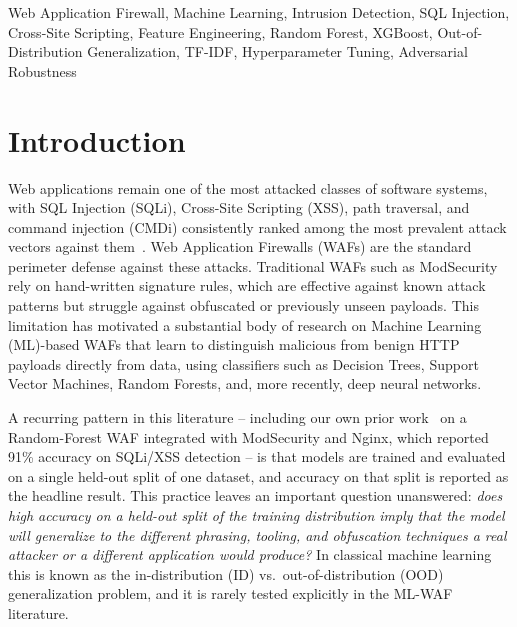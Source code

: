 \documentclass{ieeeaccess}
\begin{document}
\begin{keywords}
Web Application Firewall, Machine Learning, Intrusion Detection, SQL
Injection, Cross-Site Scripting, Feature Engineering, Random Forest, XGBoost,
Out-of-Distribution Generalization, TF-IDF, Hyperparameter Tuning,
Adversarial Robustness
\end{keywords}

\titlepgskip=-15pt

\maketitle

\section{Introduction}

Web applications remain one of the most attacked classes of software systems,
with SQL Injection (SQLi), Cross-Site Scripting (XSS), path traversal, and
command injection (CMDi) consistently ranked among the most prevalent attack
vectors against them~\cite{owasp}. Web Application Firewalls (WAFs) are the
standard perimeter defense against these attacks. Traditional WAFs such as
ModSecurity~\cite{modsecurity} rely on hand-written signature rules, which are
effective against known attack patterns but struggle against obfuscated or
previously unseen payloads. This limitation has motivated a substantial body
of research on Machine Learning (ML)-based WAFs that learn to distinguish
malicious from benign HTTP payloads directly from data, using classifiers such
as Decision Trees, Support Vector Machines, Random Forests, and, more
recently, deep neural networks.

A recurring pattern in this literature -- including our own prior
work~\cite{ourprior} on a Random-Forest WAF integrated with ModSecurity and
Nginx, which reported 91\% accuracy on SQLi/XSS detection -- is that models
are trained and evaluated on a single held-out split of one dataset, and
accuracy on that split is reported as the headline result. This practice
leaves an important question unanswered: \emph{does high accuracy on a
held-out split of the training distribution imply that the model will
generalize to the different phrasing, tooling, and obfuscation techniques a
real attacker or a different application would produce?} In classical machine
learning this is known as the in-distribution (ID) vs.\ out-of-distribution
(OOD) generalization problem, and it is rarely tested explicitly in the
ML-WAF literature.
\end{document}
